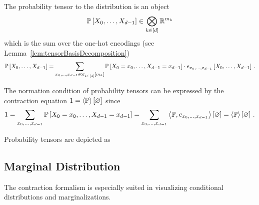 The probability tensor to the distribution is an object
		\[ \mathbb{P}\left[X_{0},\ldots,X_{d-1}\right] \in \bigotimes_{k\in[d]}\mathbb{R}^{m_{k}} \]
which is the sum over the one-hot encodings (see Lemma~\ref{lem:tensorBasisDecomposition})
		\[ \mathbb{P}\left[X_{0},\ldots,X_{d-1}\right] = \sum_{x_{0},\ldots,x_{d-1}\in\bigtimes_{k\in[d]}[m_{k}]} \mathbb{P}\left[X_{0}=x_{0},\ldots,X_{d-1}=x_{d-1}\right] \cdot e_{x_{0},\ldots,x_{d-1}}\left[X_{0},\ldots,X_{d-1}\right] \, . \]
		
The normation condition of probability tensors can be expressed by the contraction equation $1= \left\langle \mathbb{P}\right\rangle \left[ \varnothing \right]$ since
\begin{align*}
	1 = \sum_{x_{0},\ldots,x_{d-1}}\mathbb{P}\left[X_{0}=x_{0},\ldots,X_{d-1}=x_{d-1}\right]
	=  \sum_{x_{0},\ldots,x_{d-1}}\left\langle \mathbb{P}, e_{x_{0},\ldots,x_{d-1}}\right\rangle \left[ \varnothing \right]
	= \left\langle \mathbb{P}\right\rangle \left[ \varnothing \right] \, . 
\end{align*}





Probability tensors are depicted as
	\begin{center}
		
	\end{center}




\subsection{Marginal Distribution}

The contraction formalism is especially suited in visualizing conditional distributions and marginalizations.


